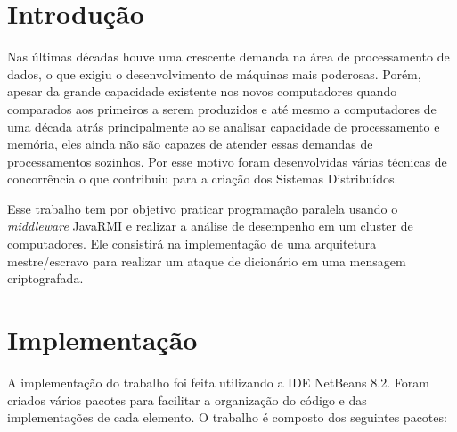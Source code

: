 \documentclass[
	12pt,				%
    oneside,			%
	a4paper,			%
	english,			%
	brazil,				%
	]{abntex2}
\begin{document}
\chapter{Introdução} 
Nas últimas décadas houve uma crescente demanda na área de processamento de dados, o que exigiu o desenvolvimento de máquinas
mais poderosas. Porém, apesar da grande capacidade existente nos novos computadores quando comparados aos primeiros a serem produzidos e até mesmo a computadores de uma década atrás principalmente ao se analisar capacidade de processamento e memória, eles ainda não são capazes de atender essas demandas de processamentos sozinhos. Por esse motivo foram desenvolvidas várias técnicas de concorrência o que contribuiu para a criação dos Sistemas Distribuídos.


Esse trabalho tem por objetivo praticar programação paralela usando o \textit{middleware} JavaRMI e realizar a análise de desempenho em um cluster de computadores. Ele consistirá na implementação de uma arquitetura mestre/escravo para realizar um ataque de dicionário em uma mensagem criptografada.


\chapter{Implementação} 
A implementação do trabalho foi feita utilizando a IDE NetBeans 8.2. Foram criados vários pacotes para facilitar a organização 
do código e das implementações de cada elemento. O trabalho é composto dos seguintes pacotes:
\end{document}
